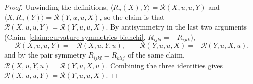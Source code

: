 \begin{proof}
\sketch
{}
\leanok
Unwinding the definitions, $\langle R_u(X),Y\rangle={\mathcal
R}(X,u,u,Y)$ and $\langle X,R_u(Y)\rangle={\mathcal R}(Y,u,u,X)$, so
the claim is that ${\mathcal R}(X,u,u,Y)={\mathcal R}(Y,u,u,X)$. By
antisymmetry in the last two arguments
(Claim~\ref{claim:curvature-symmetries-bianchi},
$R_{ijkl}=-R_{ijlk}$),
$${\mathcal R}(X,u,u,Y)=-{\mathcal R}(X,u,Y,u),\qquad
{\mathcal R}(Y,u,u,X)=-{\mathcal R}(Y,u,X,u),$$
and by the pair symmetry $R_{ijkl}=R_{klij}$ of the same claim,
${\mathcal R}(X,u,Y,u)={\mathcal R}(Y,u,X,u)$. Combining the three
identities gives ${\mathcal R}(X,u,u,Y)={\mathcal R}(Y,u,u,X)$.
\end{proof}

\begin{lemma}
\label{lem:geodesic-polar-form}


\end{lemma}
